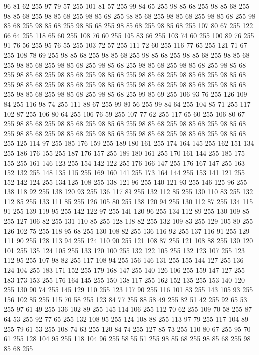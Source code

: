 96 81 62 255 97 79 57 255 101 81 57 255 99 84 65 255 98 85 68 255 98 85 68 255 98 85 68 255 98 85 68 255 98 85 68 255 98 85 68 255 98 85 68 255 98 85 68 255 98 85 68 255 98 85 68 255 98 85 68 255 98 85 68 255 98 85 68 255 107 80 67 255 122 66 64 255 118 65 60 255 108 76 60 255 105 83 66 255 103 74 60 255 100 89 76 255 91 76 56 255 95 76 55 255 103 72 57 255 111 72 60 255 116 77 65 255 121 71 67 255 108 78 69 255 98 85 68 255 98 85 68 255 98 85 68 255 98 85 68 255 98 85 68 255 98 85 68 255 98 85 68 255 98 85 68 255 98 85 68 255 98 85 68 255 98 85 68 255 98 85 68 255 98 85 68 255 98 85 68 255 98 85 68 255 98 85 68 255 98 85 68 255 98 85 68 255 98 85 68 255 98 85 68 255 98 85 68 255 98 85 68 255 98 85 68 255 98 85 68 255 98 85 68 255 98 85 68 255 99 85 69 255 106 93 76 255 126 109 84 255 116 98 74 255 111 88 67 255 99 80 56 255 99 84 64 255
104 85 71 255 117 102 87 255 106 80 64 255 106 76 59 255 107 77 62 255 117 65 60 255 106 80 67 255 98 85 68 255 98 85 68 255 98 85 68 255 98 85 68 255 98 85 68 255 98 85 68 255 98 85 68 255 98 85 68 255 98 85 68 255 98 85 68 255 98 85 68 255 98 85 68 255 125 114 97 255 185 176 159 255 189 180 161 255 174 164 145 255 162 151 134 255 186 176 155 255 187 176 157 255 189 180 161 255 170 161 144 255 185 175 155 255 161 146 123 255 154 142 122 255 176 166 147 255 176 167 147 255 163 152 132 255 148 135 115 255 169 160 141 255 173 164 144 255 153 141 121 255 152 142 124 255 134 125 108 255 138 121 96 255 140 121 93 255 146 125 96 255 138 118 92 255 138 120 93 255 136 117 89 255 132 112 85 255 130 110 83 255 132 112 85 255 133 111 85 255 126 105 80 255 138 120 94 255 130 112 87 255 134 115 91 255 139 119 95 255 142 122 97 255 141 120 96 255 134 112 89 255 130 109 85 255 127 106 82 255 131 110 85 255 128 108 82 255 132 109 83 255 129 105 80 255
126 102 75 255 118 95 68 255 130 108 82 255 136 116 92 255 137 116 91 255 129 111 90 255 128 113 94 255 124 110 90 255 121 108 87 255 121 108 88 255 130 120 101 255 135 124 105 255 133 120 100 255 132 122 105 255 132 123 107 255 123 112 95 255 107 98 82 255 117 108 94 255 156 146 131 255 155 144 127 255 136 124 104 255 183 171 152 255 179 168 147 255 140 126 106 255 159 147 127 255 183 173 153 255 176 164 145 255 150 138 117 255 162 152 135 255 153 140 120 255 130 90 74 255 145 129 110 255 123 107 90 255 116 101 83 255 143 105 93 255 156 102 85 255 115 70 58 255 123 84 77 255 88 58 49 255 82 51 42 255 92 65 53 255 97 61 49 255 136 102 89 255 145 114 106 255 112 70 62 255 109 70 58 255 87 64 53 255 92 77 65 255 132 108 95 255 124 108 88 255 113 97 79 255 117 104 89 255 79 61 53 255 108 74 63 255 120 84 74 255 127 85 73 255 110 80 67 255 95 70 61 255 128 104 95 255 118 104 96 255 58 55 51 255 98 85 68 255 98 85 68 255 98 85 68 255
